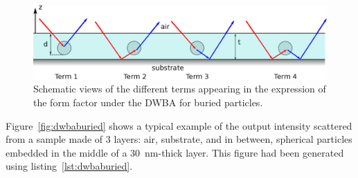 \begin{figure}[h]
\begin{center}
\includegraphics[width=\textwidth]{Figures/drawingDWBAburied}
\end{center}
\caption{Schematic views of the different terms appearing in the expression of the form factor under the DWBA for buried particles.}
\label{fig:SchemDWBAburied}
\end{figure}


Figure~\ref{fig:dwbaburied} shows a typical example of the output intensity scattered from a sample made of 3 layers: air, substrate, and in between, spherical particles embedded in the middle of a 30~nm-thick layer. This figure had been generated using listing~\ref{lst:dwbaburied}.

